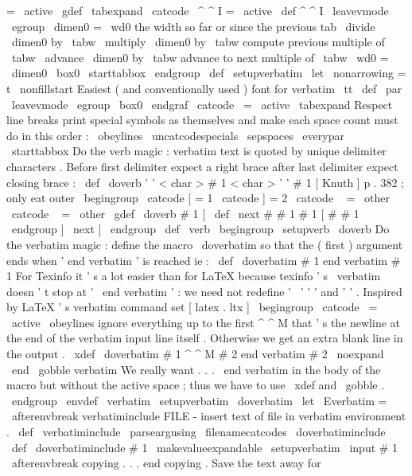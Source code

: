 {=
\
active
\
gdef
\
tabexpand
{
%
\
catcode
\
^
^
I
=
\
active
\
def
^
^
I
{
\
leavevmode
\
egroup
\
dimen0
=
\
wd0
%
the
width
so
far
or
since
the
previous
tab
\
divide
\
dimen0
by
\
tabw
\
multiply
\
dimen0
by
\
tabw
%
compute
previous
multiple
of
\
tabw
\
advance
\
dimen0
by
\
tabw
%
advance
to
next
multiple
of
\
tabw
\
wd0
=
\
dimen0
\
box0
\
starttabbox
}
%
}
\
endgroup
\
def
\
setupverbatim
{
%
\
let
\
nonarrowing
=
t
%
\
nonfillstart
%
Easiest
(
and
conventionally
used
)
font
for
verbatim
\
tt
\
def
\
par
{
\
leavevmode
\
egroup
\
box0
\
endgraf
}
%
\
catcode
\
=
\
active
\
tabexpand
%
Respect
line
breaks
%
print
special
symbols
as
themselves
and
%
make
each
space
count
%
must
do
in
this
order
:
\
obeylines
\
uncatcodespecials
\
sepspaces
\
everypar
{
\
starttabbox
}
%
}
%
Do
the
verb
magic
:
verbatim
text
is
quoted
by
unique
%
delimiter
characters
.
Before
first
delimiter
expect
a
%
right
brace
after
last
delimiter
expect
closing
brace
:
%
%
\
def
\
doverb
'
{
'
<
char
>
#
1
<
char
>
'
}
'
{
#
1
}
%
%
[
Knuth
]
p
.
382
;
only
eat
outer
{
}
\
begingroup
\
catcode
[
=
1
\
catcode
]
=
2
\
catcode
\
{
=
\
other
\
catcode
\
}
=
\
other
\
gdef
\
doverb
{
#
1
[
\
def
\
next
#
#
1
#
1
}
[
#
#
1
\
endgroup
]
\
next
]
\
endgroup
%
\
def
\
verb
{
\
begingroup
\
setupverb
\
doverb
}
%
%
%
Do
the
verbatim
magic
:
define
the
macro
\
doverbatim
so
that
%
the
(
first
)
argument
ends
when
'
end
verbatim
'
is
reached
ie
:
%
%
\
def
\
doverbatim
#
1
end
verbatim
{
#
1
}
%
%
For
Texinfo
it
'
s
a
lot
easier
than
for
LaTeX
%
because
texinfo
'
s
\
verbatim
doesn
'
t
stop
at
'
\
end
{
verbatim
}
'
:
%
we
need
not
redefine
'
\
'
'
{
'
and
'
}
'
.
%
%
Inspired
by
LaTeX
'
s
verbatim
command
set
[
latex
.
ltx
]
%
\
begingroup
\
catcode
\
=
\
active
\
obeylines
%
%
ignore
everything
up
to
the
first
^
^
M
that
'
s
the
newline
at
the
end
%
of
the
verbatim
input
line
itself
.
Otherwise
we
get
an
extra
blank
%
line
in
the
output
.
\
xdef
\
doverbatim
#
1
^
^
M
#
2
end
verbatim
{
#
2
\
noexpand
\
end
\
gobble
verbatim
}
%
%
We
really
want
{
.
.
.
\
end
verbatim
}
in
the
body
of
the
macro
but
%
without
the
active
space
;
thus
we
have
to
use
\
xdef
and
\
gobble
.
\
endgroup
%
\
envdef
\
verbatim
{
%
\
setupverbatim
\
doverbatim
}
\
let
\
Everbatim
=
\
afterenvbreak
%
verbatiminclude
FILE
-
insert
text
of
file
in
verbatim
environment
.
%
\
def
\
verbatiminclude
{
\
parseargusing
\
filenamecatcodes
\
doverbatiminclude
}
%
\
def
\
doverbatiminclude
#
1
{
%
{
%
\
makevalueexpandable
\
setupverbatim
\
input
#
1
\
afterenvbreak
}
%
}
%
copying
.
.
.
end
copying
.
%
Save
the
text
away
for
}
